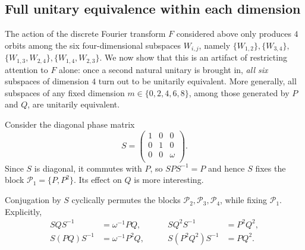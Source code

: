 \subsection{Full unitary equivalence within each dimension}
\label{subsec:full-unitary-equivalence}

The action of the discrete Fourier transform \( F \) considered above
only produces \( 4 \) orbits among the six four-dimensional subspaces
\( W_{i,j} \), namely \( \{W_{1,2}\}, \{W_{3,4}\},\) \(\{W_{1,3},W_{2,4}\},
\{W_{1,4},W_{2,3}\} \). We now show that this is an artifact of
restricting attention to \( F \) alone: once a second natural unitary
is brought in, \emph{all six} subspaces of dimension \( 4 \) turn out
to be unitarily equivalent. More generally, all
subspaces of any fixed dimension \( m \in \{0,2,4,6,8\} \), among those
generated by \( P \) and \( Q \), are unitarily equivalent.

Consider the diagonal phase matrix
\[
    S =
    \begin{pmatrix}
        1 & 0 & 0 \\
        0 & 1 & 0 \\
        0 & 0 & \omega \\
    \end{pmatrix}.
\]
Since \( S \) is diagonal, it commutes with \( P \), so
\( SPS^{-1} = P \) and hence \( S \) fixes the block
\( \mathcal{P}_1 = \{P,P^2\} \). Its effect on \( Q \) is
more interesting.

\begin{lemma}\label{lem:S-action}
    Conjugation by \( S \) cyclically permutes the blocks
    \( \mathcal{P}_2, \mathcal{P}_3, \mathcal{P}_4 \), while fixing
    \( \mathcal{P}_1 \). Explicitly,
    \[
        \begin{aligned}
            SQS^{-1} &= \omega^{-1} PQ, & \qquad SQ^2S^{-1} &= P^2Q^2, \\
            S(PQ)S^{-1} &= \omega^{-1}P^2Q, & \qquad S(P^2Q^2)S^{-1} &= PQ^2.
        \end{aligned}
    \]
\end{lemma}


